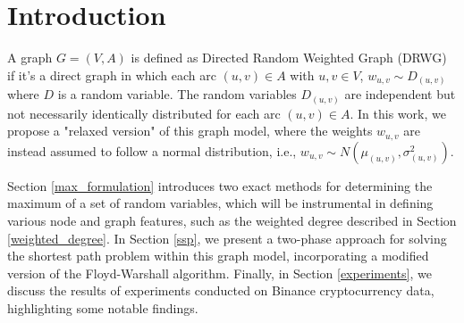 \section{Introduction}

A graph \( G = (V, A) \) is defined as Directed Random Weighted Graph (DRWG) if it's a direct graph in which each arc $(u,v) \in A$ with $u,v \in V$, $w_{u,v} \sim D_{(u,v)}$ where $D$ is a random variable. The random variables $D_{(u,v)}$ are independent but not necessarily identically distributed for each arc $(u,v) \in A$. In this work, we propose a "relaxed version" of this graph model, where the weights $w_{u,v}$ are instead assumed to follow a normal distribution, i.e., $w_{u,v} \sim N(\mu_{(u,v)}, \sigma^2_{(u,v)})$.

Section \ref{max_formulation} introduces two exact methods for determining the maximum of a set of random variables, which will be instrumental in defining various node and graph features, such as the weighted degree described in Section \ref{weighted_degree}. In Section \ref{ssp}, we present a two-phase approach for solving the shortest path problem within this graph model, incorporating a modified version of the Floyd-Warshall algorithm. Finally, in Section \ref{experiments}, we discuss the results of experiments conducted on Binance cryptocurrency data, highlighting some notable findings.